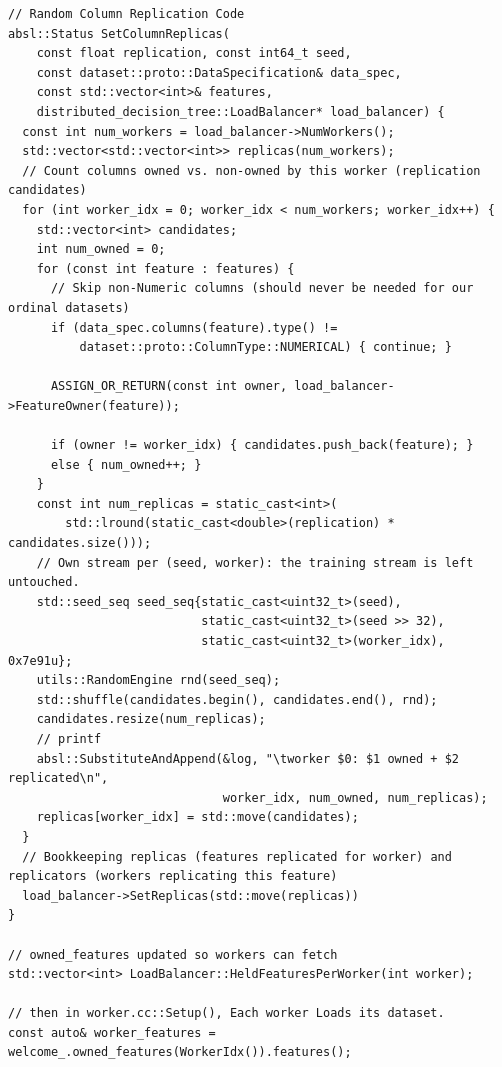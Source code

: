 \documentclass[sigconf,screen]{acmart}
\begin{document}


\begin{lstlisting}[basicstyle=\ttfamily\scriptsize,label={code:random-column-replication}]
// Random Column Replication Code
absl::Status SetColumnReplicas(
    const float replication, const int64_t seed,
    const dataset::proto::DataSpecification& data_spec,
    const std::vector<int>& features,
    distributed_decision_tree::LoadBalancer* load_balancer) {  
  const int num_workers = load_balancer->NumWorkers();
  std::vector<std::vector<int>> replicas(num_workers);
  // Count columns owned vs. non-owned by this worker (replication candidates)
  for (int worker_idx = 0; worker_idx < num_workers; worker_idx++) {
    std::vector<int> candidates;
    int num_owned = 0;
    for (const int feature : features) {
      // Skip non-Numeric columns (should never be needed for our ordinal datasets)
      if (data_spec.columns(feature).type() !=
          dataset::proto::ColumnType::NUMERICAL) { continue; }
          
      ASSIGN_OR_RETURN(const int owner, load_balancer->FeatureOwner(feature));
      
      if (owner != worker_idx) { candidates.push_back(feature); }
      else { num_owned++; }
    }
    const int num_replicas = static_cast<int>(
        std::lround(static_cast<double>(replication) * candidates.size()));
    // Own stream per (seed, worker): the training stream is left untouched.
    std::seed_seq seed_seq{static_cast<uint32_t>(seed),
                           static_cast<uint32_t>(seed >> 32),
                           static_cast<uint32_t>(worker_idx), 0x7e91u};
    utils::RandomEngine rnd(seed_seq);
    std::shuffle(candidates.begin(), candidates.end(), rnd);
    candidates.resize(num_replicas);
    // printf
    absl::SubstituteAndAppend(&log, "\tworker $0: $1 owned + $2 replicated\n",
                              worker_idx, num_owned, num_replicas);
    replicas[worker_idx] = std::move(candidates);
  }
  // Bookkeeping replicas (features replicated for worker) and replicators (workers replicating this feature)
  load_balancer->SetReplicas(std::move(replicas))
}

// owned_features updated so workers can fetch
std::vector<int> LoadBalancer::HeldFeaturesPerWorker(int worker);

// then in worker.cc::Setup(), Each worker Loads its dataset.
const auto& worker_features =   welcome_.owned_features(WorkerIdx()).features();
\end{lstlisting}
\end{document}
